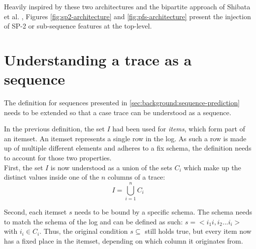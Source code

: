 Heavily inspired by these two architectures and the bipartite approach of Shibata et al. \cite{shibata2016bipartite}, Figures \ref{fig:sp2-architecture} and \ref{fig:pfs-architecture} present the injection of SP-2 or sub-sequence features at the top-level.

\section{Understanding a trace as a sequence}
The definition for sequences presented in \autoref{sec:background:sequence-prediction} needs to be extended so that a case trace can be understood as a sequence.

In the previous definition, the set $I$ had been used for \textit{items}, which form part of an itemset. An itemset represents a single row in the log. As such a row is made up of multiple different elements and adheres to a fix schema, the definition needs to account for those two properties.\\

First, the set $I$ is now understood as a union of the sets $C_i$ which make up the distinct values inside one of the $n$ columns of a trace:
$$I = \bigcup\limits_{i=1}^{n} C_{i}$$

Second, each itemset $s$ needs to be bound by a specific schema. The schema needs to match the schema of the log and can be defined as such: $s = <i_1i, i_2 ... i_i>$ with $i_i \in C_i$. Thus, the original condition $s \subseteq$ still holds true, but every item now has a fixed place in the itemset, depending on which column it originates from.